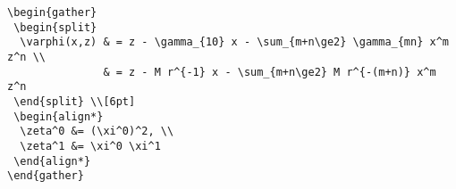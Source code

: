 \documentclass[letterpaper,12pt]{article}
\begin{document}
\pagestyle{empty}
\thispagestyle{empty}

\noindent

\begin{verbatim}
\begin{gather} 
 \begin{split} 
  \varphi(x,z) & = z - \gamma_{10} x - \sum_{m+n\ge2} \gamma_{mn} x^m z^n \\ 
               & = z - M r^{-1} x - \sum_{m+n\ge2} M r^{-(m+n)} x^m z^n 
 \end{split} \\[6pt] 
 \begin{align*} 
  \zeta^0 &= (\xi^0)^2, \\ 
  \zeta^1 &= \xi^0 \xi^1 
 \end{align*}
\end{gather}
\end{verbatim}
\end{document}
